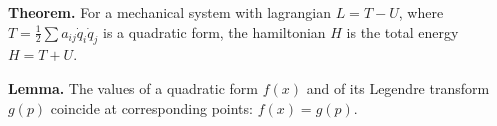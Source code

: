 \textbf{Theorem.} For a mechanical system with lagrangian $L = T - U$, where $T = \frac{1}{2}\sum a_{ij}\dot{q}_i\dot{q}_j$ is a quadratic form, the hamiltonian $H$ is the total energy $H = T + U$.

\textbf{Lemma.} The values of a quadratic form $f(x)$ and of its Legendre transform $g(p)$ coincide at corresponding points: $f(x) = g(p)$.
